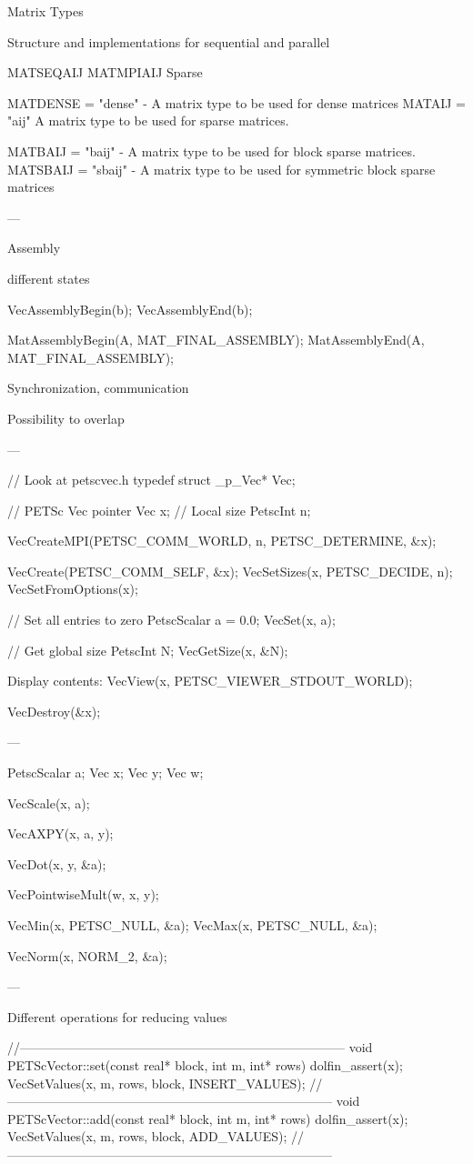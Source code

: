 \documentclass{article}
\begin{document}
Matrix Types

Structure and implementations for sequential and parallel

 MATSEQAIJ MATMPIAIJ Sparse


MATDENSE = "dense" - A matrix type to be used for dense matrices
MATAIJ = "aij" A matrix type to be used for sparse matrices.

MATBAIJ = "baij" - A matrix type to be used for block sparse matrices.
MATSBAIJ = "sbaij" - A matrix type to be used for symmetric block sparse matrices

---

Assembly

different states

VecAssemblyBegin(b);
VecAssemblyEnd(b);

MatAssemblyBegin(A, MAT_FINAL_ASSEMBLY);
MatAssemblyEnd(A, MAT_FINAL_ASSEMBLY);

Synchronization, communication

Possibility to overlap

---

// Look at petscvec.h
typedef struct _p_Vec*         Vec;

// PETSc Vec pointer
Vec x;
// Local size
PetscInt n;

VecCreateMPI(PETSC_COMM_WORLD, n, PETSC_DETERMINE, &x);

VecCreate(PETSC_COMM_SELF, &x);
VecSetSizes(x, PETSC_DECIDE, n);
VecSetFromOptions(x);

// Set all entries to zero
PetscScalar a = 0.0;
VecSet(x, a);

// Get global size
PetscInt N;
VecGetSize(x, &N);

Display contents:
VecView(x, PETSC_VIEWER_STDOUT_WORLD);

VecDestroy(&x);

---

PetscScalar a; Vec x; Vec y; Vec w;

VecScale(x, a);

VecAXPY(x, a, y);

VecDot(x, y, &a);

VecPointwiseMult(w, x, y);

VecMin(x, PETSC_NULL, &a);
VecMax(x, PETSC_NULL, &a);

VecNorm(x, NORM_2, &a);

---

Different operations for reducing values

//-----------------------------------------------------------------------------
void PETScVector::set(const real* block, int m, int* rows)
{
  dolfin_assert(x);
  VecSetValues(x, m, rows, block, INSERT_VALUES);
}
//-----------------------------------------------------------------------------
void PETScVector::add(const real* block, int m, int* rows)
{
  dolfin_assert(x);
  VecSetValues(x, m, rows, block, ADD_VALUES);
}
//-----------------------------------------------------------------------------
\end{document}
